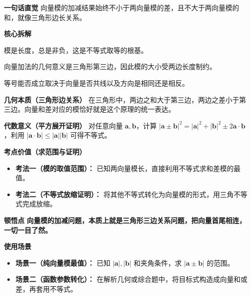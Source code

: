 \begin{explanationbox}
	\textbf{\textcolor{CExplanation}{一句话直觉}}
	向量模的加减结果始终不小于两向量模的差，且不大于两向量模的和，就像三角形边长关系。

	\medskip
	\textbf{\textcolor{CExplanation}{核心拆解}}
	\begin{description}[style=nextline, leftmargin=2.8em, labelsep=0.5em, itemsep=0.45em]
		\item[ \textbf{要点一（模的非负性）}]
			模是长度，总是非负，这是不等式取等的根基。
		\item[ \textbf{要点二（三角结构本质）}]
			向量加法的几何意义是三角形第三边，因此模的大小受两边长度制约。
		\item[ \textbf{要点三（共线取等条件）}]
			等号能否成立取决于向量是否共线以及方向是相同还是相反。
	\end{description}

	\medskip
	\textbf{\textcolor{CExplanation}{几何本质（三角形边关系）}}
	在三角形中，两边之和大于第三边，两边之差小于第三边。向量和差对应的模恰好就是这个原理的统一表达。

	\medskip
	\textbf{\textcolor{CExplanation}{代数意义（平方展开证明）}}
	对任意向量 $\mathbf{a},\mathbf{b}$，计算 $|\mathbf{a}\pm\mathbf{b}|^2 = |\mathbf{a}|^2+|\mathbf{b}|^2\pm2\mathbf{a}\cdot\mathbf{b}$，利用 $|\mathbf{a}\cdot\mathbf{b}|\le|\mathbf{a}||\mathbf{b}|$ 可得不等式。

	\medskip
	\textbf{\textcolor{CExplanation}{考点价值（求范围与证明）}}
	\begin{itemize}[leftmargin=*, itemsep=0.5em, topsep=0.4em]
		\item \textbf{考法一（模的取值范围）：} 已知两向量模长，直接利用不等式求和差模的最值。
		\item \textbf{考法二（不等式放缩证明）：} 将其他不等式转化为向量模的形式，用三角不等式完成放缩。
	\end{itemize}

	\medskip
	\textbf{\textcolor{CExplanation}{顿悟点}}
	\textbf{向量模的加减问题，本质上就是三角形三边关系问题，把向量首尾相连，一切一目了然。}

	\medskip
	\textbf{\textcolor{CExplanation}{使用场景}}
	\begin{itemize}[leftmargin=*, itemsep=0.5em, topsep=0.4em]
		\item \textbf{场景一（纯向量模最值）：} 已知 $|\mathbf{a}|,|\mathbf{b}|$ 和夹角条件，求 $|\mathbf{a}\pm\mathbf{b}|$ 的范围。
		\item \textbf{场景二（函数参数转化）：} 在解析几何或综合题中，将目标式构造成向量和或差，再套用不等式。
	\end{itemize}

\end{explanationbox}
